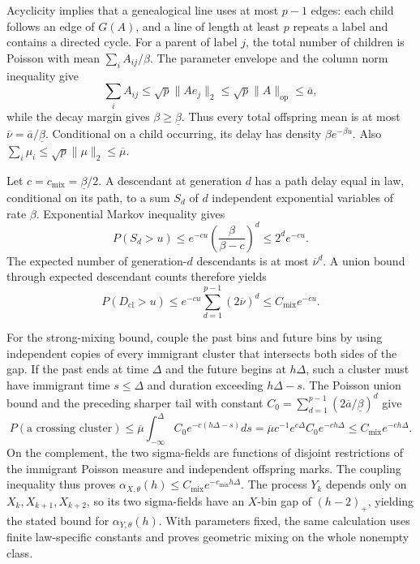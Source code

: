 Acyclicity implies that a genealogical line uses at most \(p-1\) edges: each child follows an edge of \(G(A)\), and a line of length at least \(p\) repeats a label and contains a directed cycle.  For a parent of label \(j\), the total number of children is Poisson with mean \(\sum_iA_{ij}/\beta\).  The parameter envelope and the column norm inequality give
\[
 \sum_iA_{ij}\leq\sqrt p\|Ae_j\|_2\leq\sqrt p\|A\|_{\mathrm{op}}\leq\overline a,
\]
while the decay margin gives \(\beta\geq\underline\beta\).  Thus every total offspring mean is at most \(\overline\nu=\overline a/\underline\beta\).  Conditional on a child occurring, its delay has density \(\beta e^{-\beta u}\).  Also \(\sum_i\mu_i\leq\sqrt p\|\mu\|_2\leq\overline\mu\).

Let \(c=c_{\mathrm{mix}}=\underline\beta/2\).  A descendant at generation \(d\) has a path delay equal in law, conditional on its path, to a sum \(S_d\) of \(d\) independent exponential variables of rate \(\beta\).  Exponential Markov inequality gives
\[
 P(S_d>u)\leq e^{-cu}\left(\frac{\beta}{\beta-c}\right)^d\leq2^de^{-cu}.
\]
The expected number of generation-\(d\) descendants is at most \(\overline\nu^d\).  A union bound through expected descendant counts therefore yields
\[
 P(D_{\mathrm{cl}}>u)\leq e^{-cu}\sum_{d=1}^{p-1}(2\overline\nu)^d
 \leq C_{\mathrm{mix}}e^{-cu}.
\]

For the strong-mixing bound, couple the past bins and future bins by using independent copies of every immigrant cluster that intersects both sides of the gap.  If the past ends at time \(\Delta\) and the future begins at \(h\Delta\), such a cluster must have immigrant time \(s\leq\Delta\) and duration exceeding \(h\Delta-s\).  The Poisson union bound and the preceding sharper tail with constant \(C_0=\sum_{d=1}^{p-1}(2\overline a/\underline\beta)^d\) give
\[
 P(\text{a crossing cluster})
 \leq\overline\mu\int_{-\infty}^{\Delta}C_0e^{-c(h\Delta-s)}ds
 =\overline\mu c^{-1}e^{c\Delta}C_0e^{-ch\Delta}
 \leq C_{\mathrm{mix}}e^{-ch\Delta}.
\]
On the complement, the two sigma-fields are functions of disjoint restrictions of the immigrant Poisson measure and independent offspring marks.  The coupling inequality thus proves \(\alpha_{X,\theta}(h)\leq C_{\mathrm{mix}}e^{-c_{\mathrm{mix}}h\Delta}\).  The process \(Y_k\) depends only on \(X_k,X_{k+1},X_{k+2}\), so its two sigma-fields have an \(X\)-bin gap of \((h-2)_+\), yielding the stated bound for \(\alpha_{Y,\theta}(h)\).  With parameters fixed, the same calculation uses finite law-specific constants and proves geometric mixing on the whole nonempty class.